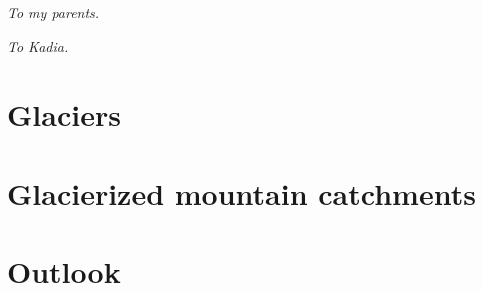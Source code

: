 \documentclass[twoside,10pt,a4paper, openright, hidelinks]{extreport}
\begin{document}

\newpage\null\thispagestyle{empty}\setcounter{page}{0}\newpage

\pagestyle{fancy}

\nobibliography*
{}
\dominitoc


{}
\begin{flushright}
\begin{small}
\textit{To my parents.}
\end{small}
\end{flushright}

\bigskip
\bigskip

\begin{flushright}
\begin{small}
\textit{To Kadia.}
\end{small}
\end{flushright}
\newpage\null\thispagestyle{empty}\newpage


\newpage
%

\tableofcontents




\newpage\null\thispagestyle{empty}\newpage

\newpage \thispagestyle{empty}


\part{Glaciers}







\part{Glacierized mountain catchments}



\part{Outlook}
\end{document}
